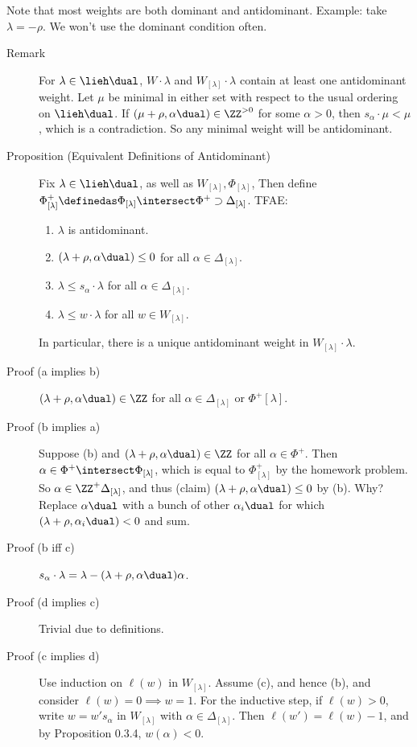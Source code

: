 Note that most weights are both dominant and antidominant. Example: take
\(\lambda = -\rho\). We won't use the dominant condition often.

\begin{description}
\item[Remark]
For \(\lambda \in \lieh\dual\), \(W\cdot \lambda\) and
\(W_{[\lambda]}\cdot \lambda\) contain at least one antidominant weight.
Let \(\mu\) be minimal in either set with respect to the usual ordering
on \(\lieh\dual\). If \((\mu + \rho, \alpha\dual) \in \ZZ^{>0}\) for
some \(\alpha > 0\), then \(s_\alpha \cdot \mu < \mu\), which is a
contradiction. So any minimal weight will be antidominant.
\item[Proposition (Equivalent Definitions of Antidominant)]
Fix \(\lambda\in\lieh\dual\), as well as
\(W_{[\lambda]}, \Phi_{[\lambda]}\), Then define
\(\Phi^+_{[\lambda]} \definedas \Phi_{[\lambda]} \intersect \Phi^+ \supset \Delta_{[\lambda]}\).
TFAE:

\begin{enumerate}
\def\labelenumi{\alph{enumi}.}
\tightlist
\item
  \(\lambda\) is antidominant.
\item
  \((\lambda + \rho, \alpha\dual) \leq 0\) for all
  \(\alpha\in \Delta_{[\lambda]}\).
\item
  \(\lambda \leq s_\alpha \cdot \lambda\) for all
  \(\alpha \in \Delta_{[\lambda]}\).
\item
  \(\lambda \leq w\cdot \lambda\) for all \(w\in W_{[\lambda]}\).
\end{enumerate}

In particular, there is a unique antidominant weight in
\(W_{[\lambda]} \cdot \lambda\).
\item[Proof (a implies b)]
\((\lambda + \rho, \alpha\dual) \in \ZZ\) for all
\(\alpha \in \Delta_{[\lambda]}\) or \(\Phi^+{[\lambda]}\).
\item[Proof (b implies a)]
Suppose (b) and \((\lambda + \rho, \alpha\dual) \in \ZZ\) for all
\(\alpha\in\Phi^+\). Then
\(\alpha \in \Phi^+ \intersect \Phi_{[\lambda]}\), which is equal to
\(\Phi^+_{[\lambda]}\) by the homework problem. So
\(\alpha \in \ZZ^+ \Delta_{[\lambda]}\), and thus (claim)
\((\lambda + \rho, \alpha\dual) \leq 0\) by (b). Why? Replace
\(\alpha\dual\) with a bunch of other \(\alpha_i\dual\) for which
\((\lambda + \rho, \alpha_i\dual) < 0\) and sum.
\item[Proof (b iff c)]
\(s_\alpha \cdot \lambda = \lambda - (\lambda + \rho, \alpha\dual)\alpha\).
\item[Proof (d implies c)]
Trivial due to definitions.
\item[Proof (c implies d)]
Use induction on \(\ell(w)\) in \(W_{[\lambda]}\). Assume (c), and hence
(b), and consider \(\ell(w) = 0 \implies w = 1\). For the inductive
step, if \(\ell(w) > 0\), write \(w = w' s_\alpha\) in \(W_{[\lambda]}\)
with \(\alpha \in \Delta_{[\lambda]}\). Then \(\ell(w') = \ell(w) - 1\),
and by Proposition 0.3.4, \(w(\alpha) < 0\).


\end{description}
